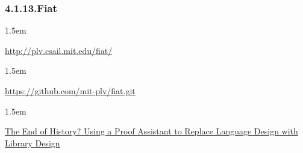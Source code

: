 \documentclass[12pt,twoside]{article}
\begin{document}
\subsubsection{4.1.13.\hspace*{0.5em}Fiat}%

\begin{mddefinitions}%


\begin{mdbmarginx}{}{}{}{1.5em}%
\begin{mddefdata}%
\href{http://plv.csail.mit.edu/fiat/}{{\ttfamily http://\hspace{0pt}plv.\hspace{0pt}csail.\hspace{0pt}mit.\hspace{0pt}edu/\hspace{0pt}fiat/\hspace{0pt}}}
\end{mddefdata}%
\end{mdbmarginx}%


\begin{mdbmarginx}{}{}{}{1.5em}%
\begin{mddefdata}%
\href{https://github.com/mit-plv/fiat.git}{{\ttfamily https://\hspace{0pt}github.\hspace{0pt}com/\hspace{0pt}mit-\hspace{0pt}plv/\hspace{0pt}fiat.\hspace{0pt}git}}
\end{mddefdata}%
\end{mdbmarginx}%


\begin{mdbmarginx}{}{}{}{1.5em}%
\begin{mddefdata}%
\href{https://www.cs.purdue.edu/homes/bendy/Fiat/fiat-snapl.pdf}{The End of History? Using a Proof Assistant to
Replace Language Design with Library Design}%
\end{mddefdata}%
\end{mdbmarginx}%
\end{mddefinitions}%
\end{document}
